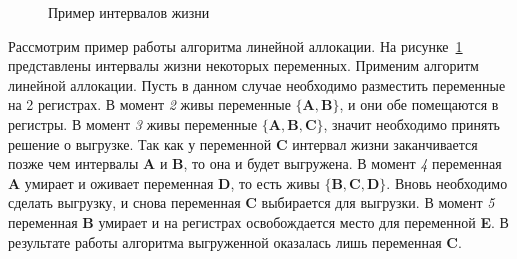 \begin{example}
    \begin{figure}
        \centering
        \caption{Пример интервалов жизни}
        \label{fig:live_interval_example}
    \end{figure}

    Рассмотрим пример работы алгоритма линейной аллокации.
    На рисунке~\ref{fig:live_interval_example} представлены интервалы жизни
    некоторых переменных.
    Применим алгоритм линейной аллокации.
    Пусть в данном случае необходимо разместить переменные на 2 регистрах.
    В момент \textit{2} живы переменные $\{\textbf{A}, \textbf{B}\}$, и они обе помещаются в регистры.
    В момент \textit{3} живы переменные $\{\textbf{A}, \textbf{B}, \textbf{C}\}$, значит необходимо принять решение о выгрузке.
    Так как у переменной $\textbf{C}$ интервал жизни заканчивается позже чем интервалы \textbf{A} и \textbf{B}, то она и будет
    выгружена.
    В момент \textit{4} переменная \textbf{A} умирает и оживает переменная \textbf{D}, то есть живы $\{\textbf{B}, \textbf{C}, \textbf{D}\}$.
    Вновь необходимо сделать выгрузку, и снова переменная \textbf{C} выбирается для выгрузки.
    В момент \textit{5} переменная \textbf{B} умирает и на регистрах освобождается место для переменной \textbf{E}.
    В результате работы алгоритма выгруженной оказалась лишь переменная \textbf{C}.
    

\end{example}
